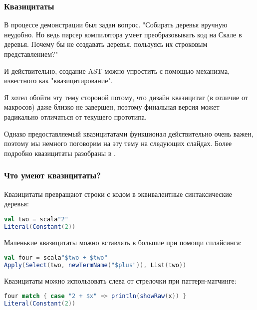 \documentclass[hyperref={bookmarks=false}]{beamer}
\begin{document}
\begin{frame}[t,fragile]
\frametitle{Квазицитаты}

В процессе демонстрации был задан вопрос. "Собирать деревья вручную неудобно. Но ведь парсер компилятора умеет преобразовывать код на Скале в деревья. Почему бы не создавать деревья, пользуясь их строковым представлением?"

И действительно, создание AST можно упростить с помощью механизма, известного как "квазицитирование".

Я хотел обойти эту тему стороной потому, что дизайн квазицитат (в отличие от макросов) даже близко не завершен, поэтому финальная версия может радикально отличаться от текущего прототипа.

Однако предоставляемый квазицитатами функционал действительно очень важен, поэтому мы немного поговорим на эту тему на следующих слайдах. Более подробно квазицитаты разобраны в .
\end{frame}

\begin{frame}[t,fragile]
\frametitle{Что умеют квазицитаты?}

Квазицитаты превращают строки с кодом в эквивалентные синтаксические деревья:

\begin{lstlisting}[language=scala]
val two = scala"2"
Literal(Constant(2))
\end{lstlisting}

Маленькие квазицитаты можно вставлять в большие при помощи сплайсинга:

\begin{lstlisting}[language=scala]
val four = scala"$two + $two"
Apply(Select(two, newTermName("$plus")), List(two))
\end{lstlisting}%

Квазицитаты можно использовать слева от стрелочки при паттерн-матчинге:

\begin{lstlisting}[language=scala]
four match { case "2 + $x" => println(showRaw(x)) }
Literal(Constant(2))
\end{lstlisting}%
\end{frame}
\end{document}
